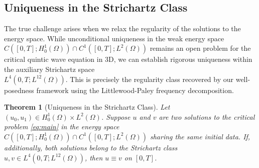 \documentclass[11pt,letterpaper]{amsart}
\newtheorem{theorem}{Theorem}[section]
\begin{document}
\subsection{Uniqueness in the Strichartz Class}

The true challenge arises when we relax the regularity of the solutions to the energy space. While unconditional uniqueness in the weak energy space $C([0,T]; H_0^1(\Omega)) \cap C^1([0,T]; L^2(\Omega))$ remains an open problem for the critical quintic wave equation in 3D, we can establish rigorous uniqueness within the auxiliary Strichartz space\\ $L^4(0,T; L^{12}(\Omega))$. This is precisely the regularity class recovered by our well-posedness framework using the Littlewood-Paley frequency decomposition.

\begin{theorem}[Uniqueness in the Strichartz Class]\label{thm:uniqueness_strichartz}
Let $(u_0, u_1) \in H_0^1(\Omega) \times L^2(\Omega)$. Suppose $u$ and $v$ are two solutions to the critical problem \eqref{eq:main} in the energy space $C([0,T]; H_0^1(\Omega)) \cap C^1([0,T]; L^2(\Omega))$ sharing the same initial data.
If, additionally, both solutions belong to the Strichartz class $u, v \in L^4(0,T; L^{12}(\Omega))$, then $u \equiv v$ on $[0,T]$.
\end{theorem}
\end{document}

